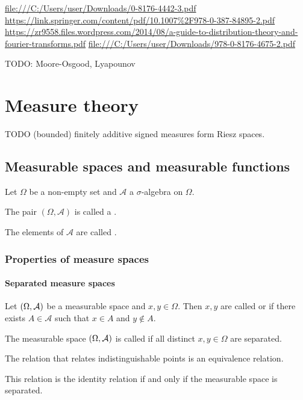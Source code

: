 \url{file:///C:/Users/user/Downloads/0-8176-4442-3.pdf}
\url{https://link.springer.com/content/pdf/10.1007%2F978-0-387-84895-2.pdf}
\url{https://zr9558.files.wordpress.com/2014/08/a-guide-to-distribution-theory-and-fourier-transforms.pdf}
\url{file:///C:/Users/user/Downloads/978-0-8176-4675-2.pdf}

TODO: Moore-Osgood, Lyapounov

\chapter{Measure theory}
TODO (bounded) finitely additive signed measures form Riesz spaces.

\section{Measurable spaces and measurable functions}
\begin{definition}
Let $\Omega$ be a non-empty set and $\mathcal{A}$ a $\sigma$-algebra on $\Omega$.

The pair $(\Omega, \mathcal{A})$ is called a .

The elements of $\mathcal{A}$ are called .
\end{definition}


\subsection{Properties of measure spaces}
\subsubsection{Separated measure spaces}
\begin{definition}
Let $\sSet{\Omega,\mathcal{A}}$ be a measurable space and $x,y\in \Omega$. Then $x,y$ are called  or  if there exists $A\in \mathcal{A}$ such that $x\in A$ and $y\notin A$.

The measurable space $\sSet{\Omega,\mathcal{A}}$ is called  if all distinct $x,y\in \Omega$ are separated.
\end{definition}

\begin{lemma}
The relation that relates indistinguishable points is an equivalence relation.

This relation is the identity relation \textup{if and only if} the measurable space is separated.
\end{lemma}

